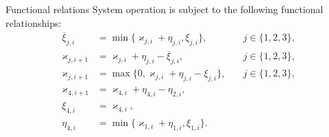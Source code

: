 \documentclass[10pt]{beamer}
\begin{document}
\begin{frame}{Functional relations}
System operation is subject to the following functional relationships:
\begin{equation}
\label{rekk}
\begin{aligned}
\overline{\xi}_{j,i}&=\min\{\varkappa_{j,i}+\eta_{j,i},\xi_{j,i}\}, \quad & j\in \{1,2,3\},\\
\varkappa_{j,i+1}&=\varkappa_{j,i}+\eta_{j,i}-\overline{\xi}_{j,i}, \quad & j\in \{1,2,3\},\\
\varkappa_{j,i+1}&=\max\{{0,\varkappa_{j,i}+\eta_{j,i}-\xi_{j,i}}\}, \quad & j\in \{1,2,3\},\\
\varkappa_{4,i+1}&=\varkappa_{4,i}+\eta_{4,i}-\eta_{2,i}, \quad &\\
\xi_{4,i} & = \varkappa_{4,i}, & \\
\eta_{4,i} & = \min\{ \varkappa_{1,i} + \eta_{1,i}, \xi_{1,i}\}.
\end{aligned}
\end{equation}
\end{frame}
\end{document}
